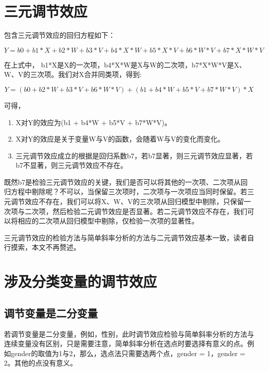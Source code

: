\documentclass[
  chinese-hans,
  letterpaper,
  DIV=11,
  numbers=noendperiod]{scrartcl}
\providecommand{\tightlist}{%
  \setlength{\itemsep}{0pt}\setlength{\parskip}{0pt}}
\begin{document}
\section{三元调节效应}\label{ux4e09ux5143ux8c03ux8282ux6548ux5e94}

包含三元调节效应的回归方程如下：

\[
Y = b0 + b1*X + b2*W + b3*V + b4*X*W + b5*X*V + b6*W*V + b7*X*W*V
\]

在上式中，
b1*X是X的一次项，b4*X*W是X与W的二次项，b7*X*W*V是X、W、V的三次项。我们对X合并同类项，得到:

\[
Y = (b0 + b2*W + b3*V + b6*W*V) + (b1 + b4*W + b5*V + b7*W*V)*X
\]

可得，

\begin{enumerate}
\def\labelenumi{\arabic{enumi}.}
\tightlist
\item
  X对Y的效应为(b1 + b4*W + b5*V + b7*W*V)。
\item
  X对Y的效应是关于变量W与V的函数，会随着W与V的变化而变化。
\item
  三元调节效应成立的根据是回归系数b7，若b7显著，则三元调节效应显著，若b7不显著，则三元调节效应不存在。
\end{enumerate}

既然b7是检验三元调节效应的关键，我们是否可以将其他的一次项、二次项从回归方程中剔除呢？不可以，当保留三次项时，二次项与一次项应当同时保留。若三元调节效应不存在，我们可以将X、W、V的三次项从回归模型中剔除，只保留一次项与二次项，然后检验二元调节效应是否显著。若二元调节效应不存在，我们可以将相应的二次项从回归模型中剔除，仅检验一次项的显著性。

三元调节效应的检验方法与简单斜率分析的方法与二元调节效应基本一致，读者自行摸索，本文不再赘述。

\section{涉及分类变量的调节效应}\label{ux6d89ux53caux5206ux7c7bux53d8ux91cfux7684ux8c03ux8282ux6548ux5e94}

\subsection{调节变量是二分变量}\label{ux8c03ux8282ux53d8ux91cfux662fux4e8cux5206ux53d8ux91cf}

若调节变量是二分变量，例如，性别，此时调节效应检验与简单斜率分析的方法与连续变量没有区别，只是需要注意，简单斜率分析在选点时要选择有意义的点。例如gender的取值为1与2，那么，选点法只需要选两个点，gender
= 1，gender = 2。其他的点没有意义。
\end{document}
